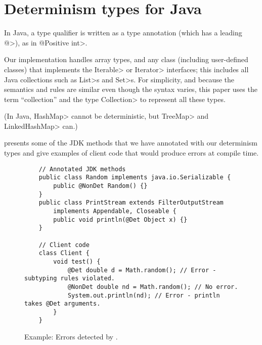 \section{Determinism types for Java}\label{sec:java-types}

In Java, a type qualifier is written as a type annotation (which has a leading \<@>), as in
\<@Positive int>.

Our implementation
handles array types, and any class (including user-defined classes) that
implements the \<Iterable> or \<Iterator> interfaces; this includes all
Java collections such as \<List>s and \<Set>s.  For simplicity, and because
the semantics and rules are similar even though the syntax varies, this
paper uses the term ``collection'' and the type \<Collection> to represent
all these types.


(In Java,
\<HashMap> cannot be deterministic, but \<TreeMap> and \<LinkedHashMap>
can.)



 presents some of the JDK methods that we have annotated with our determinism types and give examples of
client code that would produce errors at compile time.
\begin{figure}
    \begin{verbatim}
    // Annotated JDK methods
    public class Random implements java.io.Serializable {
        public @NonDet Random() {}
    }
    public class PrintStream extends FilterOutputStream 
        implements Appendable, Closeable {
        public void println(@Det Object x) {}
    }
    
    // Client code
    class Client {
        void test() {
            @Det double d = Math.random(); // Error - subtyping rules violated.
            @NonDet double nd = Math.random(); // No error.
            System.out.println(nd); // Error - println takes @Det arguments.
        }
    }
    \end{verbatim}
    \caption{Example: Errors detected by \theDeterminismChecker.}
    \label{code-determinism}
\end{figure}


